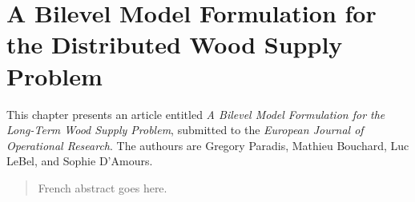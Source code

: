 \setcounter{secnumdepth}{3} 

\chapter{A Bilevel Model Formulation for the Distributed Wood Supply Problem}

This chapter presents an article entitled \emph{A Bilevel Model Formulation for the Long-Term Wood Supply Problem}, submitted to the \emph{European Journal of Operational Research}. The authours are Gregory Paradis, Mathieu Bouchard, Luc LeBel, and Sophie D'Amours.

\pagebreak


\begin{abstract}
  French abstract goes here.
\end{abstract}



